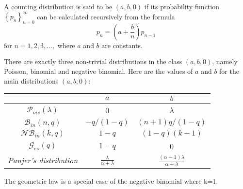 \begin{f}
	
	A counting distribution is said to be $(a, b, 0)$ if its probability function $\left\{p_{n}\right\}_{n=0}^{\infty}$ can be calculated recursively from the formula
	$$
	p_{n}=\left(a+\frac{b}{n}\right) p_{n-1}
	$$
	for $n=1,2,3, \ldots,$ where $a$ and $b$ are constants.
	
	There are exactly three non-trivial distributions in the class $(a, b, 0)$, namely Poisson, binomial and negative binomial. Here are the values of $a$ and $b$ for the main distributions $(a, b, 0)$:
	\begin{center}
		\begin{tabular}{ccc} 
			& $a$ & $b$ \\
			\hline$\mathcal{P}_{ois}(\lambda)$ & 0 & $\lambda$ \\
			$\mathcal{B}_{in}(n, q)$ & $-q /(1-q)$ & $(n+1) q /(1-q)$ \\
			$\mathcal{N}\mathcal{B}_{in}(k, q)$ & $1-q$ & $(1-q)(k-1)$ \\
			$\mathcal{G}_{eo}( q)$ & $1-q$ & 0 \\
			\textit{    Panjer's distribution} & $\frac{\lambda}{\alpha+\lambda}$ &    $\frac {(\alpha -1)\lambda }{\alpha +\lambda }$ \\
			\hline 
		\end{tabular}
		
	\end{center}
	
	{\footnotesize\color{OrangeProfondIRA} The geometric law is a special case of the negative binomial where k=1.}
\end{f}

